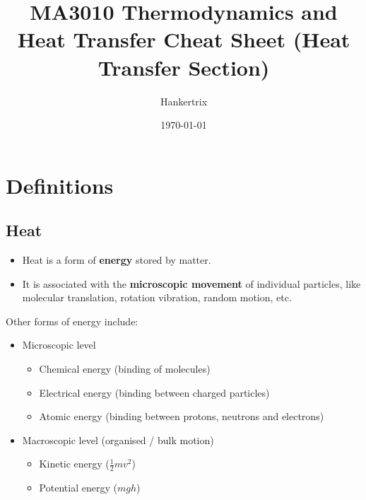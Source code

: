 \documentclass[11pt]{article}
\author{Hankertrix}
\date{\today}
\title{MA3010 Thermodynamics and Heat Transfer Cheat Sheet (Heat Transfer Section)}
\begin{document}
\maketitle
\setcounter{tocdepth}{2}
\tableofcontents \clearpage
\section{Definitions}
\label{sec:org33b3245}

\subsection{Heat}
\label{sec:org5d5c244}
\begin{itemize}
\item Heat is a form of \textbf{energy} stored by matter.
\item It is associated with the \textbf{microscopic movement} of individual particles, like molecular translation, rotation vibration, random motion, etc.
\end{itemize}

Other forms of energy include:

\begin{itemize}
\item Microscopic level
\begin{itemize}
\item Chemical energy (binding of molecules)
\item Electrical energy (binding between charged particles)
\item Atomic energy (binding between protons, neutrons and electrons)
\end{itemize}

\item Macroscopic level (organised / bulk motion)
\begin{itemize}
\item Kinetic energy (\(\frac{1}{2} mv^2\))
\item Potential energy (\(mgh\))
\end{itemize}
\end{itemize}
\end{document}
